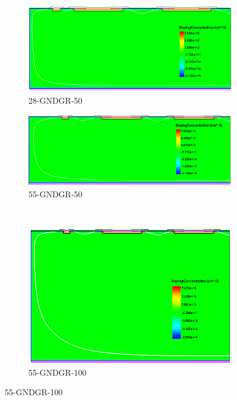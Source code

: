 \begin{figure}[htbp]
\begin{subfigure}[b]{0.5\linewidth}
    \includegraphics[width=\textwidth]{figures/TCAD/dopingConcentration_28_GNDGR.png}
    \caption{28-GNDGR-50}
  \end{subfigure}\hfill
  \begin{subfigure}[b]{0.5\linewidth}
    \includegraphics[width=\textwidth]{figures/TCAD/dopingConcentration_55_GNDGR.png}
    \caption{55-GNDGR-50}
  \end{subfigure} \\
  \begin{subfigure}[b]{0.5\linewidth}
    \includegraphics[width=\textwidth]{figures/TCAD/dopingConcentration_55_GNDGR_100.png}
    \caption{55-GNDGR-100}
  \end{subfigure}\hfill

\end{figure}
